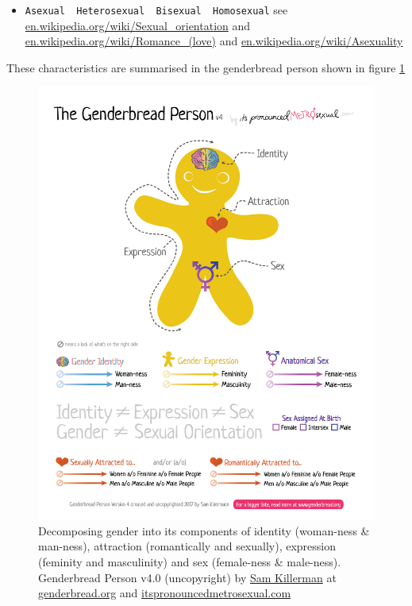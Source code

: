 \documentclass[
]{book}
\providecommand{\tightlist}{%
  \setlength{\itemsep}{0pt}\setlength{\parskip}{0pt}}
\begin{document}
\begin{enumerate}
  \begin{itemize}
  \tightlist
  \item
    \texttt{Asexual\ \textbar{}\ Heterosexual\ \textbar{}\ Bisexual\ \textbar{}\ Homosexual} see \href{https://en.wikipedia.org/wiki/Sexual_orientation}{en.wikipedia.org/wiki/Sexual\_orientation} and \href{https://en.wikipedia.org/wiki/Romance_(love)}{en.wikipedia.org/wiki/Romance\_(love)} and \href{https://en.wikipedia.org/wiki/Asexuality}{en.wikipedia.org/wiki/Asexuality}
  \end{itemize}
\end{enumerate}

These characteristics are summarised in the genderbread person shown in figure \ref{fig:genderbread-fig}

\begin{figure}

{\centering \includegraphics[width=1\linewidth]{images/Genderbread-Person-v4} 

}

\caption{Decomposing gender into its components of identity (woman-ness \& man-ness), attraction (romantically and sexually), expression (feminity and masculinity) and sex (female-ness \& male-ness). Genderbread Person v4.0 (uncopyright) by \href{https://www.samkillermann.com/}{Sam Killerman} at \href{https://www.genderbread.org/}{genderbread.org} and \href{https://www.itspronouncedmetrosexual.com/}{itspronouncedmetrosexual.com}}\label{fig:genderbread-fig}
\end{figure}
\end{document}
